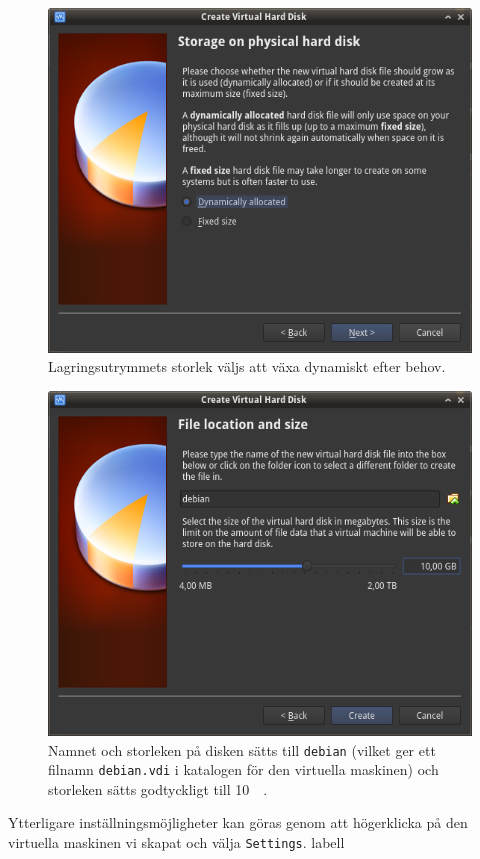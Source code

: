 \begin{figure}[htbp]
  \centering
  \includegraphics[width=\linewidth]{img/A_new-06}
  \caption{Lagringsutrymmets storlek väljs att växa dynamiskt efter behov.}
  \label{}
\end{figure}

\begin{figure}[htbp]
  \centering
  \includegraphics[width=\linewidth]{img/A_new-07}
  \caption{Namnet och storleken på disken sätts till \texttt{debian} (vilket
           ger ett filnamn \texttt{debian.vdi} i katalogen för den virtuella
           maskinen) och storleken sätts godtyckligt till \SI{10}{\mebi\byte}.}
  \label{}
\end{figure}

           {Ytterligare inställningsmöjligheter kan göras genom att högerklicka
            på den virtuella maskinen vi skapat och välja \texttt{Settings}.}
           {labell}
